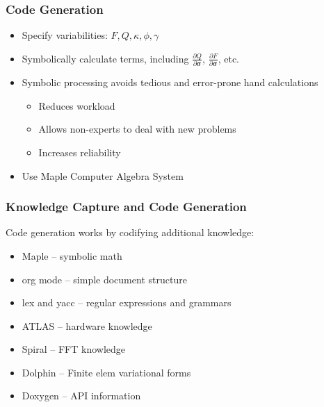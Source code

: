 \documentclass[usenames,dvipsnames]{beamer}
\begin{document}
\begin{frame}
  
  \frametitle{Code Generation}
  
  \begin{itemize}
  \item Specify variabilities: $F, Q, \kappa, \phi, \gamma$
  \item Symbolically calculate terms, including $\frac{ \partial Q}{ \partial
  \bm{\sigma}}$, $\frac{\partial F}{\partial \bm{\sigma}}$, etc.
  \item Symbolic processing avoids tedious and error-prone hand calculations
  \begin{itemize}
  \item Reduces workload
  \item Allows non-experts to deal with new problems
  \item Increases reliability
  \end{itemize}
  \item Use Maple Computer Algebra System %
  \end{itemize}
  
  \end{frame}
  
  
\begin{frame}

  \frametitle{Knowledge Capture and Code Generation}

  Code generation works by codifying additional knowledge:

  \begin{itemize}
    \item Maple -- symbolic math
    \item org mode -- simple document structure
    \item lex and yacc -- regular expressions and grammars
    \item ATLAS -- hardware knowledge \citep{WhaleyEtAl2001}
    \item Spiral -- FFT knowledge \citep{OfenbeckEtAl2017}
    \item Dolphin -- Finite elem variational forms \citep{Logg2006}
    \item Doxygen -- API information %
  \end{itemize}
  
\end{frame}
  
\end{document}
